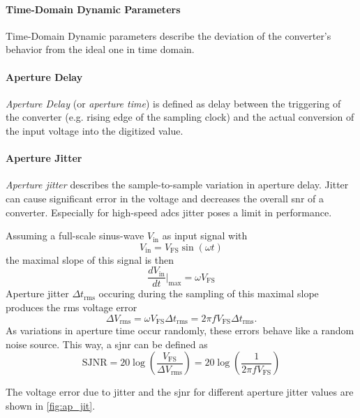 \paragraph{Time-Domain Dynamic Parameters}
Time-Domain Dynamic parameters describe the deviation of the converter's behavior from the ideal one in time domain. 
\paragraph{Aperture Delay}
\textit{Aperture Delay} (or \textit{aperture time}) is defined as delay between the triggering of the converter (e.g. rising edge of the sampling clock) and the actual conversion of the input voltage into the digitized value. \cite{Lundberg}
\paragraph{Aperture Jitter}
\textit{Aperture jitter} describes the sample-to-sample variation in aperture delay. Jitter can cause significant error in the voltage and decreases the overall \gls{snr} of a converter. Especially for high-speed \glspl{adc} jitter poses a limit in performance.

Assuming a full-scale sinus-wave $V_{\text{in}}$ as input signal with 
\begin{equation}
	V_{\text{in}} = V_{\text{FS}} \sin (\omega t)
\end{equation}
the maximal slope of this signal is then
\begin{equation}
	\frac{dV_{\text{in}}}{dt}\Bigr|_{\text{max}} = \omega V_{\text{FS}}
\end{equation}
Aperture jitter $\Delta t_{\text{rms}}$ occuring during the sampling of this maximal slope produces the \gls{rms} voltage error 
\begin{equation}
	\Delta V_{\text{rms}} = \omega  V_{\text{FS}} \Delta t_{\text{rms}} = 2 \pi f  V_{\text{FS}} \Delta t_{\text{rms}}.
\end{equation}
As variations in aperture time occur randomly, these errors behave like a random noise source. This way, a \gls{sjnr} can be defined as
\begin{equation}
	\text{SJNR} = 20 \log \left( \frac{V_{\text{FS}}}{\Delta V_{\text{rms}}} \right) = 20 \log \left( \frac{1}{2 \pi f  V_{\text{FS}}} \right)
\end{equation}

The voltage error due to jitter and the \gls{sjnr} for different aperture jitter values are shown in \autoref{fig:ap_jit}.

